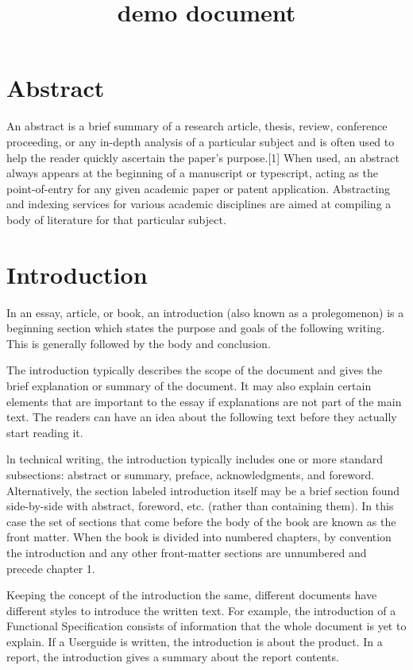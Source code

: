 \documentclass{IEEEtran}
\begin{document}
\title{demo document}
\maketitle



\section{Abstract}
An abstract is a brief summary of a research article, thesis, review, conference proceeding, or any in-depth analysis of a particular subject and is often used to help the reader quickly ascertain the paper's purpose.[1] When used, an abstract always appears at the beginning of a manuscript or typescript, acting as the point-of-entry for any given academic paper or patent application. Abstracting and indexing services for various academic disciplines are aimed at compiling a body of literature for that particular subject.


\section{Introduction}
In an essay, article, or book, an introduction (also known as a prolegomenon) is a beginning section which states the purpose and goals of the following writing. This is generally followed by the body and conclusion.

The introduction typically describes the scope of the document and gives the brief explanation or summary of the document. It may also explain certain elements that are important to the essay if explanations are not part of the main text. The readers can have an idea about the following text before they actually start reading it.

ln technical writing, the introduction typically includes one or more standard subsections: abstract or summary, preface, acknowledgments, and foreword. Alternatively, the section labeled introduction itself may be a brief section found side-by-side with abstract, foreword, etc. (rather than containing them). In this case the set of sections that come before the body of the book are known as the front matter. When the book is divided into numbered chapters, by convention the introduction and any other front-matter sections are unnumbered and precede chapter 1.

Keeping the concept of the introduction the same, different documents have different styles to introduce the written text. For example, the introduction of a Functional Specification consists of information that the whole document is yet to explain. If a Userguide is written, the introduction is about the product. In a report, the introduction gives a summary about the report contents.
\end{document}
